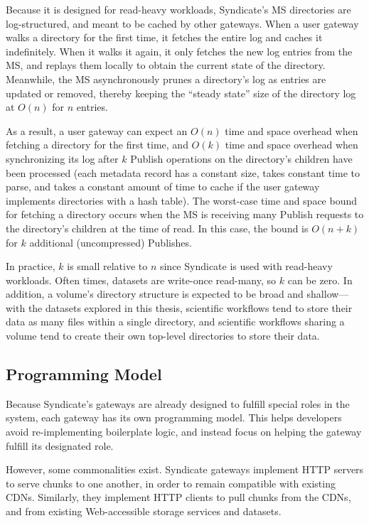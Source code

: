 Because it is designed for read-heavy workloads, Syndicate's MS
directories are log-structured, and meant to be cached by 
other gateways.  When a user gateway walks a directory for the first time, it
fetches the entire log and caches it indefinitely.  When it walks it again, it
only fetches the new log entries from the MS, and replays them locally to obtain
the current state of the directory.  Meanwhile, the MS asynchronously
prunes a directory's log as entries are updated or removed, thereby keeping the
``steady state'' size of the directory log at $O(n)$ for $n$ entries.

As a result, a user gateway can expect an $O(n)$ time and space overhead when
fetching a directory for the first time, and $O(k)$ time and space overhead
when synchronizing its log after $k$ Publish operations on the directory's
children have been processed (each metadata record
has a constant size, takes constant time to parse, and takes a constant amount 
of time to cache if the user gateway implements directories with a hash table).
The worst-case time and space bound for fetching a directory occurs
when the MS is receiving many Publish requests to the directory's children
at the time of read.  In this case, the bound is $O(n+k)$ for $k$ additional
(uncompressed) Publishes.

In practice, $k$ is small relative to $n$ since Syndicate is used with
read-heavy workloads.  Often times, datasets are write-once read-many,
so $k$ can be zero.  In addition, a volume's directory structure is expected
to be broad and shallow---with the datasets explored in this thesis,
scientific workflows tend to store their data as many files
within a single directory, and scientific workflows sharing a volume tend to
create their own top-level directories to store their data.

\subsection{Programming Model}

Because Syndicate's gateways are already designed to fulfill special roles in
the system, each gateway has its own programming model.  This helps developers
avoid re-implementing boilerplate logic, and instead focus on helping the
gateway fulfill its designated role.

However, some commonalities exist.
Syndicate gateways implement HTTP servers to serve chunks to one
another, in order to remain compatible with existing CDNs.  Similarly, they
implement HTTP clients to pull chunks from the CDNs, and from existing
Web-accessible storage services and datasets.

